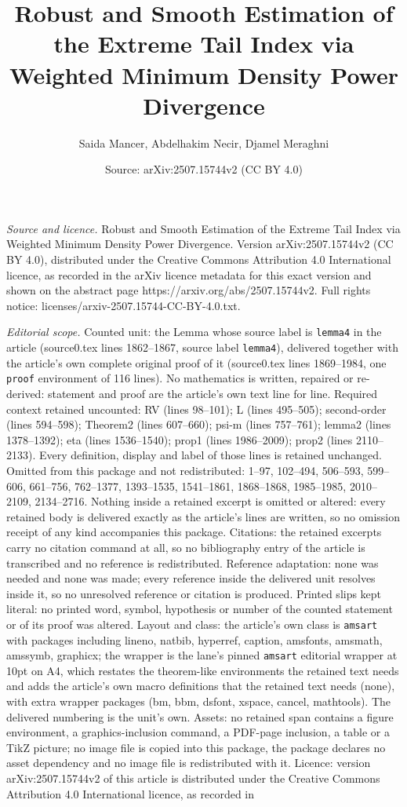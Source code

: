 \documentclass[10pt,a4paper]{amsart}
\title[Robust and Smooth Estimation of the Extreme Tail Index via W]{Robust and Smooth Estimation of the Extreme Tail Index via Weighted Minimum Density Power Divergence}
\author{Saida Mancer, Abdelhakim Necir, Djamel Meraghni}
\date{Source: arXiv:2507.15744v2 (CC BY 4.0)}
\begin{document}
\maketitle

\noindent\emph{Source and licence.} Robust and Smooth Estimation of the Extreme Tail Index via Weighted Minimum Density Power Divergence. Version arXiv:2507.15744v2 (CC BY 4.0), distributed under the Creative Commons Attribution 4.0 International licence, as recorded in the arXiv licence metadata for this exact version and shown on the abstract page https://arxiv.org/abs/2507.15744v2. Full rights notice: licenses/arxiv-2507.15744-CC-BY-4.0.txt.\par\smallskip

\noindent\textit{Editorial scope.} Counted unit: the Lemma whose source label is \texttt{lemma4} in the article (source0.tex lines 1862--1867, source label \texttt{lemma4}), delivered together with the article's own complete original proof of it (source0.tex lines 1869--1984, one \texttt{proof} environment of 116 lines). No mathematics is written, repaired or re-derived: statement and proof are the article's own text line for line. Required context retained uncounted: RV (lines 98--101); L (lines 495--505); second-order (lines 594--598); Theorem2 (lines 607--660); psi-m (lines 757--761); lemma2 (lines 1378--1392); eta (lines 1536--1540); prop1 (lines 1986--2009); prop2 (lines 2110--2133). Every definition, display and label of those lines is retained unchanged. Omitted from this package and not redistributed: 1--97, 102--494, 506--593, 599--606, 661--756, 762--1377, 1393--1535, 1541--1861, 1868--1868, 1985--1985, 2010--2109, 2134--2716. Nothing inside a retained excerpt is omitted or altered: every retained body is delivered exactly as the article's lines are written, so no omission receipt of any kind accompanies this package. Citations: the retained excerpts carry no citation command at all, so no bibliography entry of the article is transcribed and no reference is redistributed. Reference adaptation: none was needed and none was made; every reference inside the delivered unit resolves inside it, so no unresolved reference or citation is produced. Printed slips kept literal: no printed word, symbol, hypothesis or number of the counted statement or of its proof was altered. Layout and class: the article's own class is \texttt{amsart} with packages including lineno, natbib, hyperref, caption, amsfonts, amsmath, amssymb, graphicx; the wrapper is the lane's pinned \texttt{amsart} editorial wrapper at 10pt on A4, which restates the theorem-like environments the retained text needs and adds the article's own macro definitions that the retained text needs (none), with extra wrapper packages (bm, bbm, dsfont, xspace, cancel, mathtools). The delivered numbering is the unit's own. Assets: no retained span contains a figure environment, a graphics-inclusion command, a PDF-page inclusion, a table or a TikZ picture; no image file is copied into this package, the package declares no asset dependency and no image file is redistributed with it. Licence: version arXiv:2507.15744v2 of this article is distributed under the Creative Commons Attribution 4.0 International licence, as recorded in 
\end{document}
